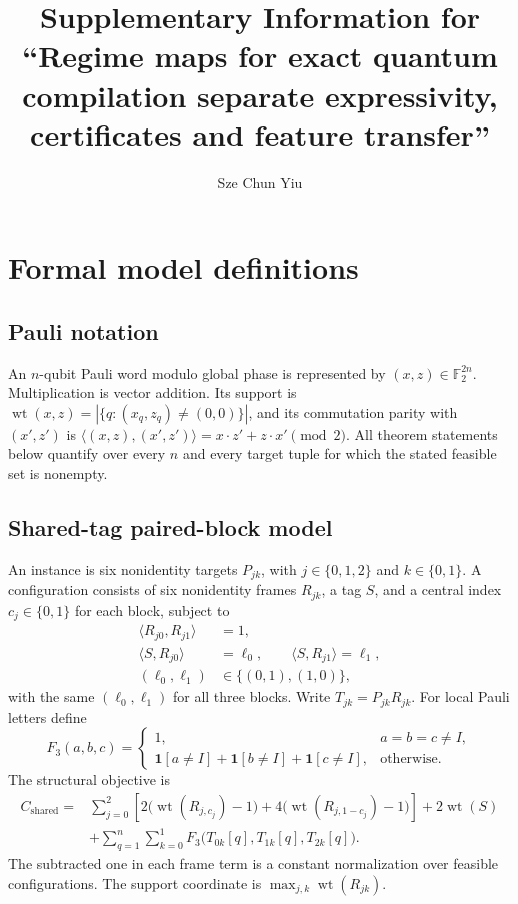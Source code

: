 \documentclass[a4paper,onecolumn,11pt,unpublished,noarxiv]{quantumarticle}
\begin{document}
\title{Supplementary Information for ``Regime maps for exact quantum compilation separate expressivity, certificates and feature transfer''}
\author{Sze Chun Yiu}
\maketitle


\section{Formal model definitions}\label{sec:formal-models}

\subsection{Pauli notation}

An $n$-qubit Pauli word modulo global phase is represented by $(x,z)\in\mathbb F_2^{2n}$.  Multiplication is vector addition.  Its support is $\operatorname{wt}(x,z)=|\{q:(x_q,z_q)\ne(0,0)\}|$, and its commutation parity with $(x',z')$ is $\langle(x,z),(x',z')\rangle=x\mathbin{\cdot}z'+z\mathbin{\cdot}x'\pmod2$.  All theorem statements below quantify over every $n$ and every target tuple for which the stated feasible set is nonempty.

\subsection{Shared-tag paired-block model}

An instance is six nonidentity targets $P_{jk}$, with $j\in\{0,1,2\}$ and $k\in\{0,1\}$.  A configuration consists of six nonidentity frames $R_{jk}$, a tag $S$, and a central index $c_j\in\{0,1\}$ for each block, subject to
\begin{align}
\langle R_{j0},R_{j1}\rangle&=1,\\
\langle S,R_{j0}\rangle&=\ell_0,\qquad
\langle S,R_{j1}\rangle=\ell_1,\\
(\ell_0,\ell_1)&\in\{(0,1),(1,0)\},
\end{align}
with the same $(\ell_0,\ell_1)$ for all three blocks.  Write $T_{jk}=P_{jk}R_{jk}$.  For local Pauli letters define
\begin{equation}
F_3(a,b,c)=
\begin{cases}
1,&a=b=c\ne I,\\
\mathbf1[a\ne I]+\mathbf1[b\ne I]+\mathbf1[c\ne I],&\text{otherwise}.
\end{cases}
\end{equation}
The structural objective is
\begin{align}
C_{\mathrm{shared}}={}&\sum_{j=0}^2\left[2\bigl(\operatorname{wt}(R_{j,c_j})-1\bigr)+4\bigl(\operatorname{wt}(R_{j,1-c_j})-1\bigr)\right]+2\operatorname{wt}(S)\nonumber\\
&+\sum_{q=1}^n\sum_{k=0}^1F_3\bigl(T_{0k}[q],T_{1k}[q],T_{2k}[q]\bigr).
\label{eq:shared-cost}
\end{align}
The subtracted one in each frame term is a constant normalization over feasible configurations.  The support coordinate is $\max_{j,k}\operatorname{wt}(R_{jk})$.
\end{document}
